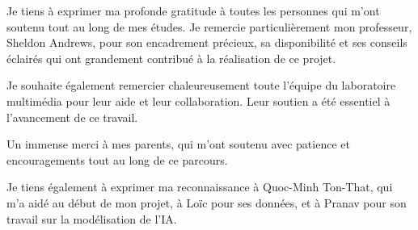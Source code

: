 \begin{remerciements}

Je tiens à exprimer ma profonde gratitude à toutes les personnes qui m'ont soutenu tout au long de mes études. Je remercie particulièrement mon professeur, Sheldon Andrews, pour son encadrement précieux, sa disponibilité et ses conseils éclairés qui ont grandement contribué à la réalisation de ce projet.

Je souhaite également remercier chaleureusement toute l'équipe du laboratoire multimédia pour leur aide et leur collaboration. Leur soutien a été essentiel à l'avancement de ce travail.

Un immense merci à mes parents, qui m'ont soutenu avec patience et encouragements tout au long de ce parcours.

Je tiens également à exprimer ma reconnaissance à Quoc-Minh Ton-That, qui m'a aidé au début de mon projet, à Loïc pour ses données, et à Pranav pour son travail sur la modélisation de l'IA.

\end{remerciements}